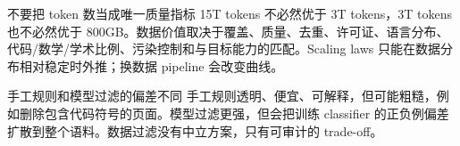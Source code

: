 \begin{warningbox}{不要把 token 数当成唯一质量指标}
15T tokens 不必然优于 3T tokens，3T tokens 也不必然优于 800GB。数据价值取决于覆盖、质量、去重、许可证、语言分布、代码/数学/学术比例、污染控制和与目标能力的匹配。Scaling laws 只能在数据分布相对稳定时外推；换数据 pipeline 会改变曲线。
\end{warningbox}

\begin{warningbox}{手工规则和模型过滤的偏差不同}
手工规则透明、便宜、可解释，但可能粗糙，例如删除包含代码符号的页面。模型过滤更强，但会把训练 classifier 的正负例偏差扩散到整个语料。数据过滤没有中立方案，只有可审计的 trade-off。
\end{warningbox}

